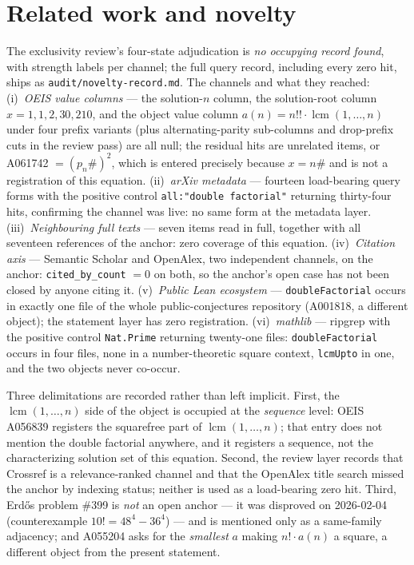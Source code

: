 \documentclass[11pt]{article}
\theoremstyle{definition}
\begin{document}
\section{Related work and novelty}\label{sec:related}

The exclusivity review's four-state adjudication is \emph{no occupying record
found}, with strength labels per channel; the full query record, including
every zero hit, ships as \texttt{audit/novelty-record.md}. The channels and what
they reached: (i)~\emph{OEIS value columns} --- the solution-$n$ column, the
solution-root column $x = 1,1,2,30,210$, and the object value column
$a(n) = n!! \cdot \operatorname{lcm}(1,\dots,n)$ under four prefix variants
(plus alternating-parity sub-columns and drop-prefix cuts in the review pass)
are all null; the residual hits are unrelated items, or A061742 $= (p_n\#)^2$,
which is entered precisely because $x = n\#$ and is not a registration of this
equation. (ii)~\emph{arXiv metadata} --- fourteen load-bearing query forms
with the positive control \texttt{all:"double factorial"} returning
thirty-four hits, confirming the channel was live: no same form at the
metadata layer. (iii)~\emph{Neighbouring full texts} --- seven items read in
full, together with all seventeen references of the anchor: zero coverage of
this equation. (iv)~\emph{Citation axis} --- Semantic Scholar and OpenAlex,
two independent channels, on the anchor: \texttt{cited\_by\_count} $= 0$ on
both, so the anchor's open case has not been closed by anyone citing it.
(v)~\emph{Public Lean ecosystem} --- \texttt{doubleFactorial} occurs in exactly
one file of the whole public-conjectures repository (A001818, a different
object); the statement layer has zero registration. (vi)~\emph{mathlib} ---
ripgrep with the positive control \texttt{Nat.Prime} returning twenty-one
files: \texttt{doubleFactorial} occurs in four files, none in a
number-theoretic square context, \texttt{lcmUpto} in one, and the two objects
never co-occur.

Three delimitations are recorded rather than left implicit. First, the
$\operatorname{lcm}(1,\dots,n)$ side of the object is occupied at the
\emph{sequence} level: OEIS A056839 registers the squarefree part of
$\operatorname{lcm}(1,\dots,n)$; that entry does not mention the double
factorial anywhere, and it registers a sequence, not the characterizing
solution set of this equation. Second, the review layer records that Crossref
is a relevance-ranked channel and that the OpenAlex title search missed the
anchor by indexing status; neither is used as a load-bearing zero hit. Third,
Erd\H{o}s problem \#399 is \emph{not} an open anchor --- it was disproved on
2026-02-04 (counterexample $10! = 48^4 - 36^4$) --- and is mentioned only as a
same-family adjacency; and A055204 asks for the \emph{smallest} $a$ making
$n! \cdot a(n)$ a square, a different object from the present statement.
\end{document}

